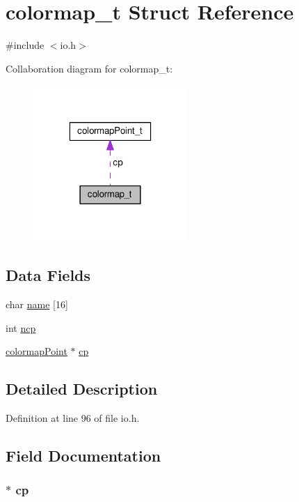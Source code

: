 \hypertarget{structcolormap__t}{\section{colormap\-\_\-t Struct Reference}
\label{structcolormap__t}
}


{\ttfamily \#include $<$io.\-h$>$}



Collaboration diagram for colormap\-\_\-t\-:\nopagebreak
\begin{figure}[H]
\begin{center}
\leavevmode
\includegraphics[width=166pt]{structcolormap__t__coll__graph}
\end{center}
\end{figure}
\subsection*{Data Fields}
\begin{DoxyCompactItemize}
\item 
char \hyperlink{structcolormap__t_acd328517a6cf718155c2e6e22b671ca9}{name} \mbox{[}16\mbox{]}
\item 
int \hyperlink{structcolormap__t_a8f4ec518913edf916c0dc3cbb49991b7}{ncp}
\item 
\hyperlink{io_8h_a2bf5ae344b8526b236f7152ce0424670}{colormap\-Point} $\ast$ \hyperlink{structcolormap__t_a64cbb09ad4367b201326341a4b500844}{cp}
\end{DoxyCompactItemize}


\subsection{Detailed Description}


Definition at line 96 of file io.\-h.



\subsection{Field Documentation}
\hypertarget{structcolormap__t_a64cbb09ad4367b201326341a4b500844}{
\subsubsection[{cp}]{$\ast$ cp}}\label{structcolormap__t_a64cbb09ad4367b201326341a4b500844}



